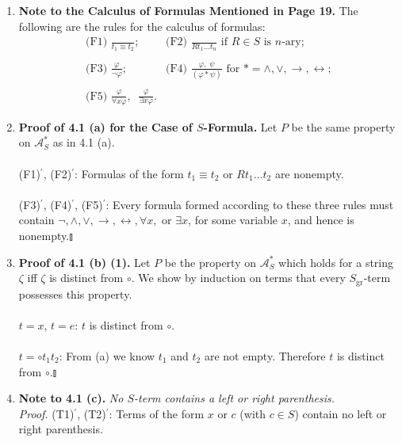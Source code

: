 \begin{enumerate}[1.]
\item \textbf{Note to the Calculus of Formulas Mentioned in Page 19.} The following are the rules for the calculus of formulas:
\[
\begin{array}{ll}
\mbox{(F1) }\displaystyle \frac{\,}{t_1 \equiv t_2}; & \mbox{(F2) }\displaystyle \frac{\,}{Rt_1 \ldots t_n} \mbox{ if $R \in S$ is $n$-ary}; \\
\, & \, \\
\mbox{(F3) }\displaystyle \frac{\varphi}{\neg \varphi}; & \mbox{(F4) }\displaystyle \frac{\displaystyle {\varphi, \; \psi}}{(\varphi \ast \psi)} \mbox{ for $\ast = \land, \lor, \rightarrow, \leftrightarrow$}; \\
\, & \, \\
\mbox{(F5) }\displaystyle \frac{\varphi}{\forall x \varphi}, \;\; \displaystyle \frac{\varphi}{\exists x \varphi}. & \ 
\end{array}
\]
%
\item \textbf{Proof of 4.1 (a) for the Case of $S$-Formula.} Let $P$ be the same property on $\mathcal{A}_S^*$ as in 4.1 (a). \\
\\
(F1)$^\prime$, (F2)$^\prime$: Formulas of the form $t_1 \equiv t_2$ or $Rt_1 \ldots t_2$ are nonempty. \\
\\
(F3)$^\prime$, (F4)$^\prime$, (F5)$^\prime$: Every formula formed according to these three rules must contain $\neg, \land, \lor, \rightarrow, \leftrightarrow, \forall x,$ or $\exists x$, for some variable $x$, and hence is nonempty.\nolinebreak\hfill$\talloblong$
%
\item \textbf{Proof of 4.1 (b) (1).} Let $P$ be the property on $\mathcal{A}_S^*$ which holds for a string $\zeta$ iff $\zeta$ is distinct from $\circ$. We show by induction on terms that every $S_{\mathrm{gr}}$-term possesses this property. \\
\\
$t=x$, $t=e$: $t$ is distinct from $\circ$. \\
\\
$t=\circ t_1 t_2$: From (a) we know $t_1$ and $t_2$ are not empty. Therefore $t$ is distinct from $\circ$.\nolinebreak\hfill$\talloblong$
%
\item \textbf{Note to 4.1 (c).} \textit{No $S$-term contains a left or right parenthesis.} \\
\textit{Proof.} (T1)$^\prime$, (T2)$^\prime$: Terms of the form $x$ or $c$ (with $c \in S$) contain no left or right parenthesis. \\

\end{enumerate}
